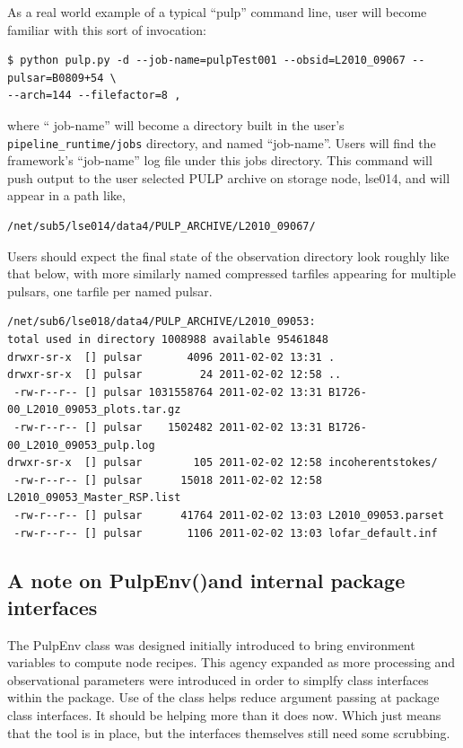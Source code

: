 \documentclass[a4paper,10pt,bibtotoc]{scrartcl}
\begin{document}
As a real world example of a typical ``pulp'' command line, user will
become familiar with this sort of invocation:

\begin{verbatim}
$ python pulp.py -d --job-name=pulpTest001 --obsid=L2010_09067 --pulsar=B0809+54 \
--arch=144 --filefactor=8 ,
\end{verbatim}
where `` job-name'' will become a directory built in the user's
\verb|pipeline_runtime/jobs| directory, and named ``job-name''.  Users
will find the framework's ``job-name'' log file under this jobs
directory.  This command will push output to the user selected PULP
archive on storage node, lse014, and will appear in a path like,

\begin{verbatim}
/net/sub5/lse014/data4/PULP_ARCHIVE/L2010_09067/
\end{verbatim}
Users should expect the final state of the observation directory look
roughly like that below, with more similarly named compressed tarfiles appearing for
multiple pulsars, one tarfile per named pulsar.
\begin{verbatim}
/net/sub6/lse018/data4/PULP_ARCHIVE/L2010_09053:
total used in directory 1008988 available 95461848
drwxr-sr-x  [] pulsar       4096 2011-02-02 13:31 .
drwxr-sr-x  [] pulsar         24 2011-02-02 12:58 ..
 -rw-r--r-- [] pulsar 1031558764 2011-02-02 13:31 B1726-00_L2010_09053_plots.tar.gz
 -rw-r--r-- [] pulsar    1502482 2011-02-02 13:31 B1726-00_L2010_09053_pulp.log
drwxr-sr-x  [] pulsar        105 2011-02-02 12:58 incoherentstokes/
 -rw-r--r-- [] pulsar      15018 2011-02-02 12:58 L2010_09053_Master_RSP.list
 -rw-r--r-- [] pulsar      41764 2011-02-02 13:03 L2010_09053.parset
 -rw-r--r-- [] pulsar       1106 2011-02-02 13:03 lofar_default.inf
\end{verbatim}


\subsection{A note on PulpEnv()and internal package interfaces}
The PulpEnv class was designed initially introduced to bring environment variables
to compute node recipes.  This agency expanded as more processing and observational
parameters were introduced in order to simplfy class interfaces within the package.
Use of the class helps reduce argument passing at package class interfaces.  It should be helping more than it does now. Which just means that the tool is in place,
but the interfaces themselves still need some scrubbing.
\end{document}
